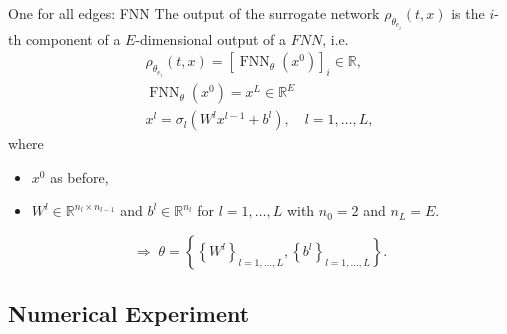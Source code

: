 \documentclass[9pt]{beamer}
\begin{document}
\begin{frame}{One for all edges: FNN}
    The output of the surrogate network $\rho_{\theta_{e_i}}\left( t, x \right)$ is the $i$-th component of a $E$-dimensional output of a $FNN$, i.e. \\ 
    \begin{equation*}
        \begin{gathered}
            \rho_{\theta_{e_i}}\left( t, x \right) = \left[\operatorname{FNN}_{\theta} \left(x^0\right)  \right]_i \in \mathbb{R}, \\
            \operatorname{FNN}_{\theta}\left(x^0\right) = x^L \in \mathbb{R}^E\\
            x^l = \sigma_l \left(W^l x^{l-1} + b^{l}\right), \quad l = 1, \ldots, L,
        \end{gathered} 
    \end{equation*}
    where \\
    \begin{itemize}
        \item $x^0$ as before,
        \item $W^l \in \mathbb{R}^{n_l \times n_{l-1}}$ and $b^l \in \mathbb{R}^{n_l}$ for $l = 1, \ldots, L$ with $n_0 = 2$ and $n_L = E$.
    \end{itemize}
    \vspace{5mm}

    \begin{equation*}
        \Rightarrow \; \theta = \left\{ \left\{ W^l \right\}_{l = 1, \ldots, L}, \left\{ b^l \right\}_{l = 1, \ldots, L} \right\}.
    \end{equation*}
\end{frame}



\subsection{Numerical Experiment}
\end{document}
